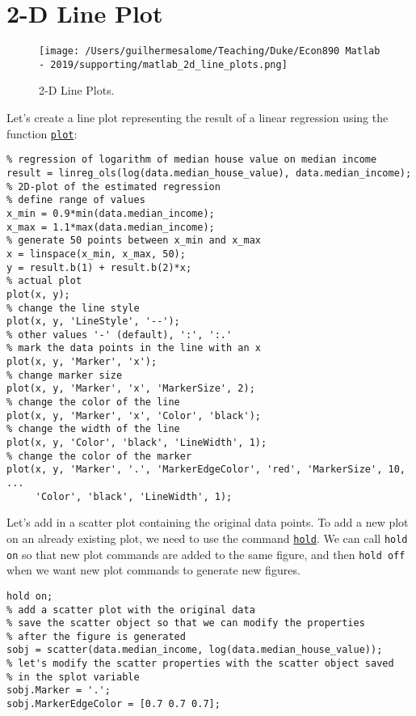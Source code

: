 \documentclass[12pt, a4paper]{article}
\begin{document}
\section{2-D Line Plot}
\label{sec:org90f17f8}
\begin{figure}[H]
\centering
\texttt{[image: /Users/guilhermesalome/Teaching/Duke/Econ890 Matlab - 2019/supporting/matlab\_2d\_line\_plots.png]}
\caption{\label{fig:org86ca9fb}
2-D Line Plots.}
\end{figure}

Let's create a line plot representing the result of a linear regression using the function \href{https://www.mathworks.com/help/matlab/ref/plot.html}{\texttt{plot}}:
\lstset{language=matlab,label= ,caption= ,captionpos=b,firstnumber=1,numbers=left,style=Matlab-editor}
\begin{lstlisting}
% regression of logarithm of median house value on median income
result = linreg_ols(log(data.median_house_value), data.median_income);
% 2D-plot of the estimated regression
% define range of values
x_min = 0.9*min(data.median_income);
x_max = 1.1*max(data.median_income);
% generate 50 points between x_min and x_max
x = linspace(x_min, x_max, 50);
y = result.b(1) + result.b(2)*x;
% actual plot
plot(x, y);
% change the line style
plot(x, y, 'LineStyle', '--');
% other values '-' (default), ':', ':.'
% mark the data points in the line with an x
plot(x, y, 'Marker', 'x');
% change marker size
plot(x, y, 'Marker', 'x', 'MarkerSize', 2);
% change the color of the line
plot(x, y, 'Marker', 'x', 'Color', 'black');
% change the width of the line
plot(x, y, 'Color', 'black', 'LineWidth', 1);
% change the color of the marker
plot(x, y, 'Marker', '.', 'MarkerEdgeColor', 'red', 'MarkerSize', 10, ...
     'Color', 'black', 'LineWidth', 1);
\end{lstlisting}
Let's add in a scatter plot containing the original data points.
To add a new plot on an already existing plot, we need to use the command \href{https://www.mathworks.com/help/matlab/ref/hold.html}{\texttt{hold}}.
We can call \texttt{hold on} so that new plot commands are added to the same figure, and then \texttt{hold off} when we want new plot commands to generate new figures.
\lstset{language=matlab,label= ,caption= ,captionpos=b,firstnumber=1,numbers=left,style=Matlab-editor}
\begin{lstlisting}
hold on;
% add a scatter plot with the original data
% save the scatter object so that we can modify the properties
% after the figure is generated
sobj = scatter(data.median_income, log(data.median_house_value));
% let's modify the scatter properties with the scatter object saved
% in the splot variable
sobj.Marker = '.';
sobj.MarkerEdgeColor = [0.7 0.7 0.7];
\end{lstlisting}
\end{document}
